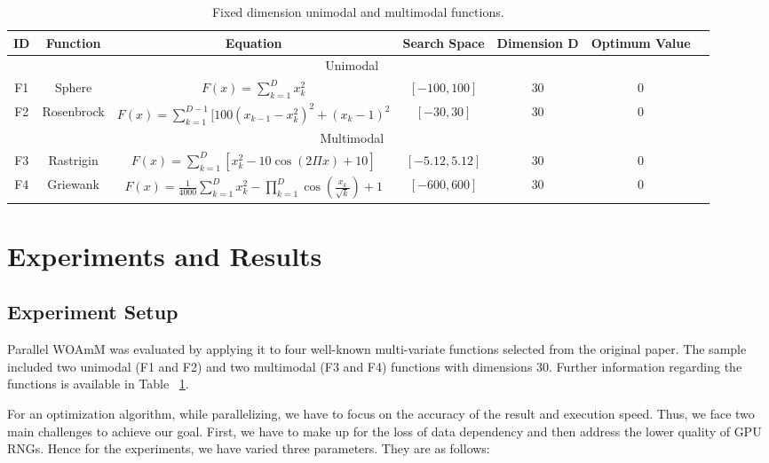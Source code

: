 \documentclass[conference]{IEEEtran}
\begin{document}
\begin{table}[!t]\renewcommand{\arraystretch}{1.3}
    \caption{Fixed dimension unimodal and multimodal functions.}
    \label{tbl:func}
    \centering
    \begin{tabular}{c||c||c||c||c||c||c}
    \hline\bfseries ID & \bfseries Function & \bfseries Equation & \bfseries Search Space & \bfseries Dimension D & \bfseries Optimum Value\\
    \hline \multicolumn{6}{c}{Unimodal} \\
    \hline F1 & Sphere & \(F(x)=\sum_{k=1}^Dx_k^2\) & \([-100,100]\)&30&0\\
    \hline
    \hline F2 & Rosenbrock & \(F(x)=\sum_{k=1}^{D-1}[100(x_{k-1}-x_k^2)^2+(x_k-1)^2\) & \([-30,30]\)&30&0\\
    \hline
    \hline \multicolumn{6}{c}{Multimodal} \\
    \hline F3 & Rastrigin & \(F(x)=\sum_{k=1}^{D}[x_k^2-10\cos(2\Pi x)+10]\) & \([-5.12,5.12]\)&30&0\\
    \hline
    \hline F4 & Griewank & \(F(x)=\frac{1}{4000}\sum_{k=1}^{D}x_k^2-\prod_{k=1}^D\cos(\frac{x_k}{\sqrt{k}})+1\) & \([-600,600]\)&30&0\\
    \hline
\end{tabular}
\end{table}

\section{Experiments and Results}

\subsection{Experiment Setup}

Parallel WOAmM was evaluated by applying it to four well-known multi-variate functions selected from the original paper. 
The sample included two unimodal (F1 and F2) and two multimodal (F3 and F4) functions with dimensions 30. 
Further information regarding the functions is available in Table ~\ref{tbl:func}.

For an optimization algorithm, while parallelizing, we have to focus on the accuracy of the result and execution speed. 
Thus, we face two main challenges to achieve our goal. 
First, we have to make up for the loss of data dependency and then address the lower quality of GPU RNGs. 
Hence for the experiments, we have varied three parameters. 
They are as follows:
\end{document}
